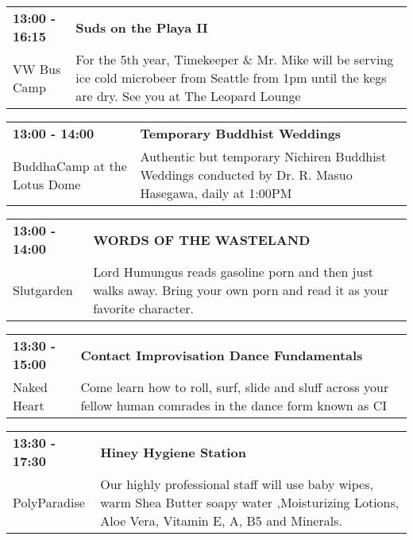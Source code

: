 \begin{tabular}{ p{1in} p{2.2in} }
    \textbf{13:00 - 16:15} & \textbf{Suds on the Playa II} \\
    VW Bus Camp \newline  & For the 5th year, Timekeeper \& Mr. Mike will be serving ice cold microbeer from Seattle from 1pm until the kegs are dry. See you at The Leopard Lounge \\
    \hline 
\end{tabular}
    
\begin{tabular}{ p{1in} p{2.2in} }
    \textbf{13:00 - 14:00} & \textbf{Temporary Buddhist Weddings} \\
    BuddhaCamp at the Lotus Dome \newline  & Authentic but temporary Nichiren Buddhist Weddings conducted by Dr. R. Masuo Hasegawa, daily at 1:00PM \\
    \hline 
\end{tabular}
    
\begin{tabular}{ p{1in} p{2.2in} }
    \textbf{13:00 - 14:00} & \textbf{WORDS OF THE WASTELAND} \\
    Slutgarden \newline  & Lord Humungus reads gasoline porn and then just walks away. Bring your own porn and read it as your favorite character. \\
    \hline 
\end{tabular}
    
\begin{tabular}{ p{1in} p{2.2in} }
    \textbf{13:30 - 15:00} & \textbf{Contact Improvisation Dance Fundamentals} \\
    Naked Heart \newline  & Come learn how to roll, surf, slide and sluff across your fellow human comrades in the dance form known as CI \\
    \hline 
\end{tabular}
    
\begin{tabular}{ p{1in} p{2.2in} }
    \textbf{13:30 - 17:30} & \textbf{Hiney Hygiene Station} \\
    PolyParadise \newline  & Our highly professional staff  will use baby wipes, warm Shea Butter soapy water ,Moisturizing Lotions, Aloe Vera, Vitamin E, A, B5 and Minerals. \\
    \hline 
\end{tabular}
    
